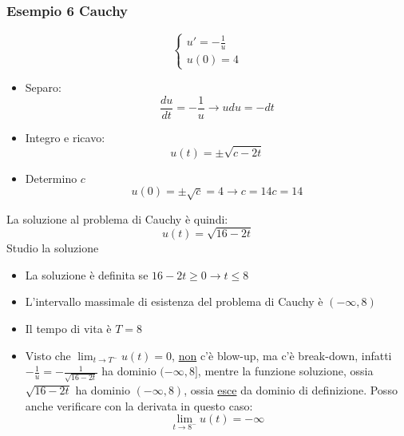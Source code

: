 \subsubsection*{Esempio 6 Cauchy}
\[
	\begin{cases}
		u' = -\frac{1}{u} \\
		u\left( 0 \right) =4
	\end{cases}
\]
\begin{itemize}
	\item Separo:
	      \[
		      \frac{du}{dt}= -\frac{1}{u} \rightarrow u du = -dt
	      \]
	\item Integro e ricavo:
	      \[
		      u\left( t \right) = \pm \sqrt{c - 2t}
	      \]
	\item Determino $ c $
	      \[
		      u\left( 0 \right) = \pm \sqrt{c} =4 \rightarrow c=14 c=14
	      \]
\end{itemize}
La soluzione al problema di Cauchy è quindi:
\[
	u\left( t \right) = \sqrt{16-2t}
\]
Studio la soluzione
\begin{itemize}
	\item La soluzione è definita se $ 16 - 2t \ge 0  \rightarrow t \le 8$
	\item L'intervallo massimale di esistenza del problema di Cauchy è $ \left( -\infty, 8 \right)  $
	\item Il tempo di vita è $ T=8 $
	\item Visto che $ \lim_{t \to T^{-}} u\left( t \right)  = 0 $, \underline{non} c'è blow-up, ma c'è break-down, infatti $ -\frac{1}{u}=-\frac{1}{\sqrt{16-2t} } $ ha dominio $ (-\infty, 8] $, mentre la funzione soluzione, ossia $ \sqrt{16-2t}  $ ha dominio $ \left( -\infty, 8 \right)  $, ossia \underline{esce} da dominio di definizione. Posso anche verificare con la derivata in questo caso:
	      \[
		      \lim_{t \to 8^{-}} u\left( t \right)  = - \infty
	      \]
\end{itemize}
